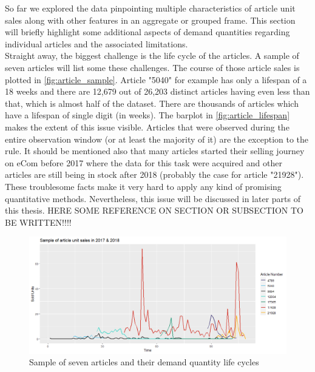 

So far we explored the data pinpointing multiple characteristics of article unit sales along with other features in an aggregate or grouped frame. This section will briefly highlight some additional aspects of demand quantities regarding individual articles and the associated limitations.
\\

Straight away, the biggest challenge is the life cycle of the articles. A sample of seven articles will list some these challenges. The course of those article sales is plotted in \autoref{fig:article_sample}. Article "5040" for example has only a lifespan of a 18 weeks and there are 12,679 out of 26,203 distinct articles having even less than that, which is almost half of the dataset. There are thousands of articles which have a lifespan of single digit (in weeks). The barplot in \autoref{fig:article_lifespan} makes the extent of this issue visible. Articles that were observed during the entire observation window (or at least the majority of it) are the exception to the rule. It should be mentioned also that many articles started their selling journey on eCom before 2017 where the data for this task were acquired and other articles are still being in stock after 2018 (probably the case for article "21928"). These troublesome facts make it very hard to apply any kind of promising quantitative methods. Nevertheless, this issue will be discussed in later parts of this thesis. HERE SOME REFERENCE ON SECTION OR SUBSECTION TO BE WRITTEN!!!!
\\


\begin{figure}[H]
\centering
  \includegraphics[width=0.95\linewidth]{figures/article_sample.png}
  \caption{Sample of seven articles and their demand quantity life cycles}
  \label{fig:article_sample}
\end{figure}


